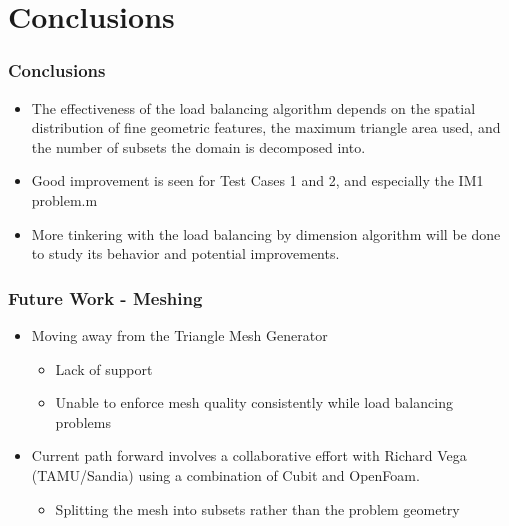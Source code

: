 \documentclass[compress]{beamer}
\begin{document}
\section{Conclusions}
\begin{frame}[t]\frametitle{Conclusions}
\begin{block}{}
\begin{itemize}
\item The effectiveness of the load balancing algorithm depends on the spatial distribution of fine geometric features, the maximum triangle area used, and the number of subsets the domain is decomposed into.
\item Good improvement is seen for Test Cases 1 and 2, and especially the IM1 problem.m
\item More tinkering with the load balancing by dimension algorithm will be done to study its behavior and potential improvements.
\end{itemize}
\end{block}
\end{frame}

\begin{frame}[t]\frametitle{Future Work - Meshing}
\begin{block}{}
\begin{itemize}
\item Moving away from the Triangle Mesh Generator
	\begin{itemize}
		\item Lack of support
		\item Unable to enforce mesh quality consistently while load balancing problems
	\end{itemize}
\item Current path forward involves a collaborative effort with Richard Vega (TAMU/Sandia) using a combination of Cubit and OpenFoam.
	\begin{itemize}
		\item Splitting the mesh into subsets rather than the problem geometry
	\end{itemize}
\end{itemize}
\end{block}
\end{frame}
\end{document}
